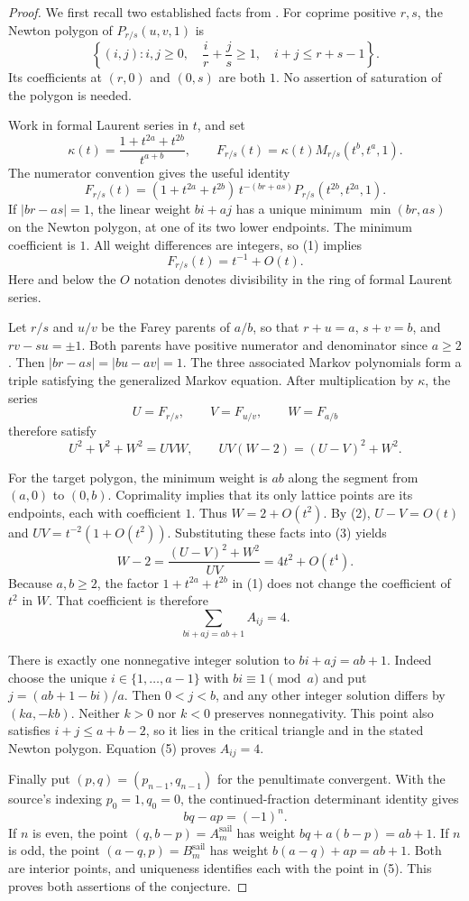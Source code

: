 \documentclass[11pt]{article}
\begin{document}
\begin{proof}
We first recall two established facts from
\cite[Theorems 3.2 and 4.2]{EVW}. For coprime positive $r,s$, the
Newton polygon of $P_{r/s}(u,v,1)$ is
\[
 \left\{(i,j):i,j\geq0,\quad \frac{i}{r}+\frac{j}{s}\geq1,
                    \quad i+j\leq r+s-1\right\}.
\]
Its coefficients at $(r,0)$ and $(0,s)$ are both $1$.
No assertion of saturation of the polygon is needed.

Work in formal Laurent series in $t$, and set
\[
 \kappa(t)=\frac{1+t^{2a}+t^{2b}}{t^{a+b}},\qquad
 F_{r/s}(t)=\kappa(t)M_{r/s}(t^b,t^a,1).
\]
The numerator convention gives the useful identity
\[
 F_{r/s}(t)
 =(1+t^{2a}+t^{2b})\,t^{-(br+as)}
                     P_{r/s}(t^{2b},t^{2a},1).
 \tag{1}
\]
If $|br-as|=1$, the linear weight $bi+aj$ has a unique minimum
$\min(br,as)$ on the Newton polygon, at one of its two lower
endpoints. The minimum coefficient is $1$. All weight differences
are integers, so (1) implies
\[
 F_{r/s}(t)=t^{-1}+O(t).
 \tag{2}
\]
Here and below the $O$ notation denotes divisibility in the ring
of formal Laurent series.

Let $r/s$ and $u/v$ be the Farey parents of $a/b$, so that
$r+u=a$, $s+v=b$, and $rv-su=\pm1$.
Both parents have positive numerator and denominator since $a\geq2$.
Then $|br-as|=|bu-av|=1$.
The three associated Markov polynomials form a triple satisfying
the generalized Markov equation. After multiplication by $\kappa$,
the series
\[
 U=F_{r/s},\qquad V=F_{u/v},\qquad W=F_{a/b}
\]
therefore satisfy
\[
 U^2+V^2+W^2=UVW,\qquad
 UV(W-2)=(U-V)^2+W^2.
 \tag{3}
\]

For the target polygon, the minimum weight is $ab$ along the segment
from $(a,0)$ to $(0,b)$. Coprimality implies that its only lattice
points are its endpoints, each with coefficient $1$. Thus
$W=2+O(t^2)$. By (2), $U-V=O(t)$ and
$UV=t^{-2}(1+O(t^2))$. Substituting these facts into (3) yields
\[
 W-2=\frac{(U-V)^2+W^2}{UV}
     =4t^2+O(t^4).
 \tag{4}
\]
Because $a,b\geq2$, the factor $1+t^{2a}+t^{2b}$ in (1)
does not change the coefficient of $t^2$ in $W$.
That coefficient is therefore
\[
 \sum_{bi+aj=ab+1} A_{ij}=4.
 \tag{5}
\]

There is exactly one nonnegative integer solution to
$bi+aj=ab+1$. Indeed choose the unique $i\in\{1,\ldots,a-1\}$
with $bi\equiv1\pmod a$ and put $j=(ab+1-bi)/a$.
Then $0<j<b$, and any other integer solution differs by
$(ka,-kb)$. Neither $k>0$ nor $k<0$ preserves nonnegativity.
This point also satisfies $i+j\leq a+b-2$, so it lies in the
critical triangle and in the stated Newton polygon.
Equation (5) proves $A_{ij}=4$.

Finally put $(p,q)=(p_{n-1},q_{n-1})$ for the penultimate convergent.
With the source's indexing $p_0=1,q_0=0$, the continued-fraction
determinant identity gives
\[
 bq-ap=(-1)^n.
\]
If $n$ is even, the point $(q,b-p)=A_m^{\mathrm{sail}}$ has
weight $bq+a(b-p)=ab+1$.
If $n$ is odd, the point $(a-q,p)=B_m^{\mathrm{sail}}$ has
weight $b(a-q)+ap=ab+1$.
Both are interior points, and uniqueness identifies each with the
point in (5). This proves both assertions of the conjecture.
\end{proof}
\end{document}
